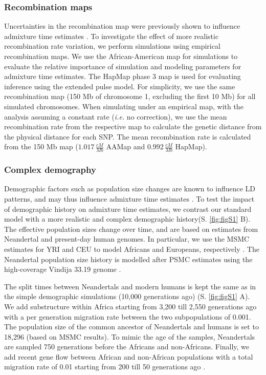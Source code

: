 \documentclass[]{article}
\begin{document}
\subsubsection{Recombination maps}\label{recombination map}
Uncertainties in the recombination map were previously shown to influence admixture time estimates \citep{sankararaman_date_2012,fu_genome_2014,sankararaman_combined_2016}. To investigate the effect of more realistic
recombination rate variation, we perform simulations using empirical recombination maps. We use the  African-American map \citep{hinch_landscape_2011} for simulations to evaluate the relative importance of simulation and modeling parameters for admixture time estimates. The HapMap phase 3 map \citep{HapMapConsortium_second_2007} is used for evaluating inference using the extended pulse model. For simplicity, we use the same
recombination map (150 Mb of chromosome 1, excluding the first 10 Mb)
for all simulated chromosomes. When simulating under an empirical map, with the analysis assuming a constant rate (\emph{i.e.} no correction), we use the mean recombination rate from the respective map to calculate the genetic distance from the physical distance for each SNP. The mean recombination rate is
calculated from the 150 Mb map (\(1.017 \, \frac{cM}{Mb}\) AAMap and
\(0.992 \, \frac{cM}{Mb}\) HapMap).



\subsubsection{Complex demography}\label{inferred demography}
Demographic factors such as population size changes are known to influence LD
patterns, and may thus influence admixture time estimates \citep{gravel_population_2012,liang_lengths_2014}. To test the impact of
demographic history on admixture time estimates, we contrast our standard model with a more 
realistic and complex demographic history(S. \ref{fig:figS1} B). The effective population
sizes change over time, and are based on estimates from Neandertal and present-day human genomes. In particular, we use the MSMC estimates for YRI and CEU to model Africans and Europeans, respectively 
\citep{schiffels_inferring_2014}. The Neandertal population size history is modelled after  PSMC estimates \citep{li_inference_2011} using the high-coverage Vindija 33.19 genome
\citep{prufer_high-coverage_2017}. 

The split times between Neandertals and
modern humans is kept the
same as in the simple demographic simulations (10,000 generations ago) (S. \ref{fig:figS1} A). We add substructure within Africa starting from 3,200 till 2,550 generations ago with a per generation migration rate between the two subpopulations of 0.001. The population size of the common ancestor of Neandertals and humans  is set to 18,296 (based on MSMC results). To mimic the age of the samples, Neandertals are sampled 750 generations before the Africans and non-Africans. Finally, we add recent gene flow between African and non-African populations with a total migration rate of 0.01 starting from 200 till 50 generations ago \citep{petr_limits_2019}.
\end{document}
